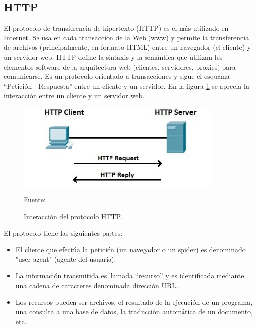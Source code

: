 \subsection{HTTP}
El protocolo de transferencia de hipertexto (HTTP) es el más utilizado en Internet. Se usa en cada transacción de la Web (www) y permite la transferencia de archivos (principalmente, en formato HTML) entre un navegador (el cliente) y un servidor web. HTTP define la sintaxis y la semántica que utilizan los elementos software de la arquitectura web (clientes, servidores, proxies) para comunicarse. Es un protocolo orientado a transacciones y sigue el esquema ``Petición - Respuesta'' entre un cliente y un servidor. En la figura \ref{fig:http} se aprecia la interacción entre un cliente y un servidor web.

\begin{figure}[H]
    \begin{center}
        \includegraphics[width=10cm]{img/capitulo_2/http1.jpg}
        \caption{Interacción del protocolo HTTP.\\}
        Fuente: \cite{http}
        \label{fig:http}
    \end{center}
\end{figure}

El protocolo tiene las siguientes partes:
\begin{itemize}
    \item El cliente que efectúa la petición (un navegador o un spider) es denominado "user agent" (agente del usuario). 
    \item La información transmitida es llamada ``recurso'' y es identificada mediante una cadena de caracteres denominada dirección URL.
    \item Los recursos pueden ser archivos, el resultado de la ejecución de un programa, una consulta a una base de datos, la traducción automática de un documento, etc.
\end{itemize}

